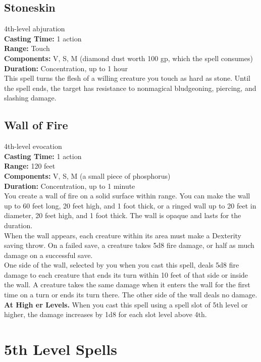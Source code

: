 \documentclass[11pt, A4paper, english]{article}
\begin{document}
		\subsection{Stoneskin}
4th-level abjuration \\
\textbf{Casting Time:} 1 action \\
\textbf{Range:} Touch \\
\textbf{Components:} V, S, M (diamond dust worth 100 gp, which the spell consumes) \\
\textbf{Duration:} Concentration, up to 1 hour \\
This spell turns the flesh of a willing creature you touch as hard as stone. Until the spell ends, the target has resistance to nonmagical bludgeoning, piercing, and slashing damage.

		\subsection{Wall of Fire}
4th-level evocation \\
\textbf{Casting Time:} 1 action \\
\textbf{Range:} 120 feet \\
\textbf{Components:} V, S, M (a small piece of phosphorus) \\
\textbf{Duration:} Concentration, up to 1 minute \\
You create a wall of fire on a solid surface within range. You can make the wall up to 60 feet long, 20 feet high, and 1 foot thick, or a ringed wall up to 20 feet in diameter, 20 feet high, and 1 foot thick. The wall is opaque and lasts for the duration. \\
When the wall appears, each creature within its area must make a Dexterity saving throw. On a failed save, a creature takes 5d8 fire damage, or half as much damage on a successful save. \\
One side of the wall, selected by you when you cast this spell, deals 5d8 fire damage to each creature that ends its turn within 10 feet of that side or inside the wall. A creature takes the same damage when it enters the wall for the first time on a turn or ends its turn there. The other side of the wall deals no damage. \\
\textbf{At High er Levels.} When you cast this spell using a spell slot of 5th level or higher, the damage increases by 1d8 for each slot level above 4th.



	\section{5th Level Spells}
\end{document}
